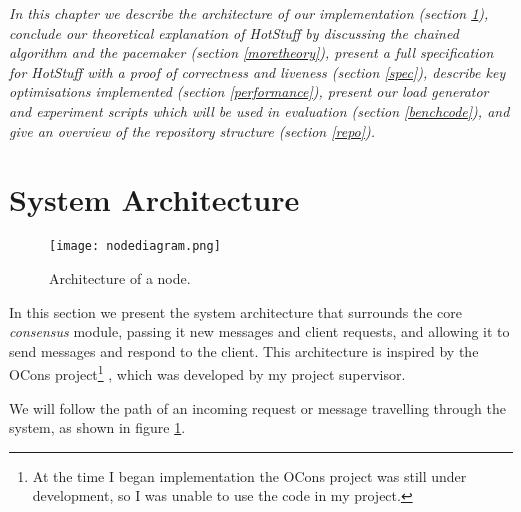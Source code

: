 \textit{In this chapter we describe the architecture of our implementation (section \ref{architecture}), conclude our theoretical explanation of HotStuff by discussing the chained algorithm and the pacemaker (section \ref{moretheory}), present a full specification for HotStuff with a proof of correctness and liveness (section \ref{spec}), describe key optimisations implemented (section \ref{performance}), present our load generator and experiment scripts which will be used in evaluation (section \ref{benchcode}), and give an overview of the repository structure (section \ref{repo}).}

\section{System Architecture} \label{architecture}

\begin{figure}[h!]
\centering
\texttt{[image: nodediagram.png]}
\caption{Architecture of a node.}
\label{nodediagram}
\end{figure}

In this section we present the system architecture that surrounds the core \textit{consensus} module, passing it new messages and client requests, and allowing it to send messages and respond to the client. This architecture is inspired by the OCons project\footnote{At the time I began implementation the OCons project was still under development, so I was unable to use the code in my project.} \cite{ocons}, which was developed by my project supervisor.

We will follow the path of an incoming request or message travelling through the system, as shown in figure \ref{nodediagram}.

